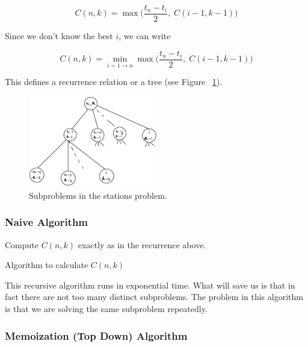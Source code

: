 $$
C(n, k) = \max \Big (\frac{t_n - t_i}{2}, \; C(i - 1, k - 1) \Big )
$$

Since we don't know the best $i$, we can write 

$$
C(n, k) = \min_{i = 1 \to n} \max \Big (\frac{t_n - t_i}{2}, \; C(i -
1, k - 1) \Big )
$$

This defines a recurrence relation or a tree (see Figure~
\ref{fig:dp-tree}).

\begin{figure}[hpt]
    \centering
    \includegraphics[width=0.5\textwidth]{figures/dp-tree.jpeg}
    \caption{Subproblems in the stations problem.}
    \label{fig:dp-tree}
\end{figure}

\subsubsection{Naive Algorithm}

Compute $C(n, k)$ exactly as in the recurrence above.

\begin{algorithm}
\caption{Algorithm to calculate $C(n, k)$}
\begin{algorithmic}
\ENDIF
{}
\ENDIF
{}
\ENDIF
\ENDFOR
{}
\end{algorithmic}
\end{algorithm}

This recursive algorithm runs in exponential time. What will save us
is that in fact there are not too many distinct subproblems. The
problem in this algorithm is that we are solving the same subproblem
repeatedly.

\subsubsection{Memoization (Top Down) Algorithm}

